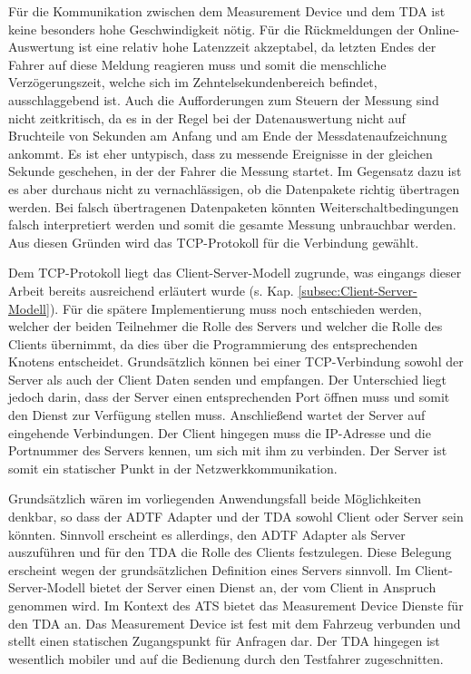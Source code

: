 \documentclass[12pt,a4paper]{report}
\begin{document}
Für die Kommunikation zwischen dem Measurement Device und dem TDA ist keine besonders hohe Geschwindigkeit nötig. Für die Rückmeldungen der Online-Auswertung ist eine relativ hohe Latenzzeit akzeptabel, da letzten Endes der Fahrer auf diese Meldung reagieren muss und somit die menschliche Verzögerungszeit, welche sich im Zehntelsekundenbereich befindet, ausschlaggebend ist. Auch die Aufforderungen zum Steuern der Messung sind nicht zeitkritisch, da es in der Regel bei der Datenauswertung nicht auf Bruchteile von Sekunden am Anfang und am Ende der Messdatenaufzeichnung ankommt. Es ist eher untypisch, dass zu messende Ereignisse in der gleichen Sekunde geschehen, in der der Fahrer die Messung startet. Im Gegensatz dazu ist es aber durchaus nicht zu vernachlässigen, ob die Datenpakete richtig übertragen werden. Bei falsch übertragenen Datenpaketen könnten Weiterschaltbedingungen falsch interpretiert werden und somit die gesamte Messung unbrauchbar werden. Aus diesen Gründen wird das TCP-Protokoll für die Verbindung gewählt.

Dem TCP-Protokoll liegt das Client-Server-Modell zugrunde, was eingangs dieser Arbeit bereits ausreichend erläutert wurde (s. Kap. \ref{subsec:Client-Server-Modell}). Für die spätere Implementierung muss noch entschieden werden, welcher der beiden Teilnehmer die Rolle des Servers und welcher die Rolle des Clients übernimmt, da dies über die Programmierung des entsprechenden Knotens entscheidet. Grundsätzlich können bei einer TCP-Verbindung sowohl der Server als auch der Client Daten senden und empfangen. Der Unterschied liegt jedoch darin, dass der Server einen entsprechenden Port öffnen muss und somit den Dienst zur Verfügung stellen muss. Anschließend wartet der Server auf eingehende Verbindungen. Der Client hingegen muss die IP-Adresse und die Portnummer des Servers kennen, um sich mit ihm zu verbinden. Der Server ist somit ein statischer Punkt in der Netzwerkkommunikation.

Grundsätzlich wären im vorliegenden Anwendungsfall beide Möglichkeiten denkbar, so dass der ADTF Adapter und der TDA sowohl Client oder Server sein könnten. Sinnvoll erscheint es allerdings, den ADTF Adapter als Server auszuführen und für den TDA die Rolle des Clients festzulegen. Diese Belegung erscheint wegen der grundsätzlichen Definition eines Servers sinnvoll. Im Client-Server-Modell bietet der Server einen Dienst an, der vom Client in Anspruch genommen wird. Im Kontext des ATS bietet das Measurement Device Dienste für den TDA an. Das Measurement Device ist fest mit dem Fahrzeug verbunden und stellt einen statischen Zugangspunkt für Anfragen dar. Der TDA hingegen ist wesentlich mobiler und auf die Bedienung durch den Testfahrer zugeschnitten. 
\end{document}
